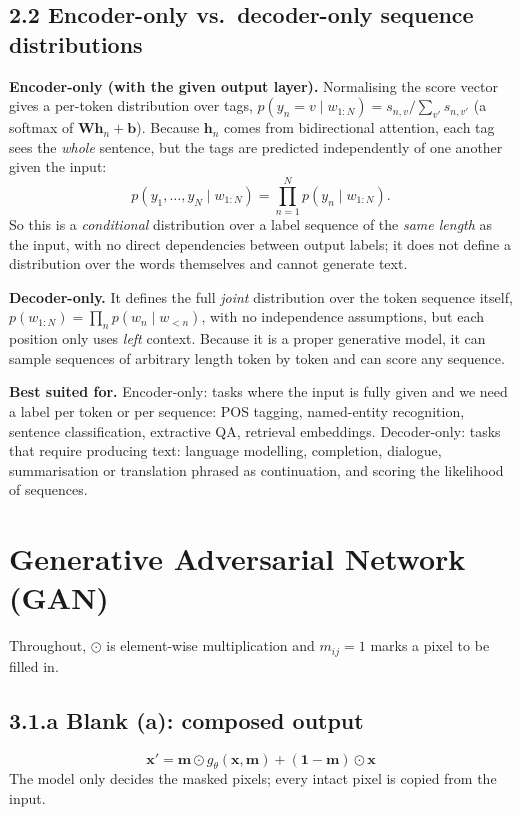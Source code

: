 \documentclass[11pt,a4paper]{article}
\newcommand{\x}{\mathbf{x}}
\begin{document}
\subsection*{2.2 Encoder-only vs.\ decoder-only sequence distributions}

\textbf{Encoder-only (with the given output layer).} Normalising the score vector gives a per-token distribution over tags, $p(y_n=v\mid w_{1:N}) = s_{n,v}/\sum_{v'} s_{n,v'}$ (a softmax of $\mathbf{W}\mathbf{h}_n+\mathbf{b}$). Because $\mathbf{h}_n$ comes from bidirectional attention, each tag sees the \emph{whole} sentence, but the tags are predicted independently of one another given the input:
\[
p(y_1,\dots,y_N\mid w_{1:N}) = \prod_{n=1}^{N} p(y_n\mid w_{1:N}).
\]
So this is a \emph{conditional} distribution over a label sequence of the \emph{same length} as the input, with no direct dependencies between output labels; it does not define a distribution over the words themselves and cannot generate text.

\textbf{Decoder-only.} It defines the full \emph{joint} distribution over the token sequence itself, $p(w_{1:N})=\prod_n p(w_n\mid w_{<n})$, with no independence assumptions, but each position only uses \emph{left} context. Because it is a proper generative model, it can sample sequences of arbitrary length token by token and can score any sequence.

\textbf{Best suited for.} Encoder-only: tasks where the input is fully given and we need a label per token or per sequence: POS tagging, named-entity recognition, sentence classification, extractive QA, retrieval embeddings. Decoder-only: tasks that require producing text: language modelling, completion, dialogue, summarisation or translation phrased as continuation, and scoring the likelihood of sequences.

\section{Generative Adversarial Network (GAN)}

Throughout, $\odot$ is element-wise multiplication and $m_{ij}=1$ marks a pixel to be filled in.

\subsection*{3.1.a Blank (a): composed output}
\[
\x' = \mathbf{m}\odot g_\theta(\x,\mathbf{m}) + (\mathbf{1}-\mathbf{m})\odot \x
\]
The model only decides the masked pixels; every intact pixel is copied from the input.
\end{document}

